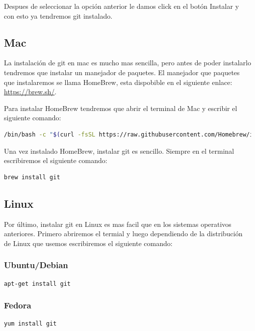 \documentclass[11pt, oneside]{article}
\begin{document}
Despues de seleccionar la opción anterior le damos click en el botón Instalar y con esto ya tendremos git instalado.

\subsection{Mac}
La instalación de git en mac es mucho mas sencilla, pero antes de poder instalarlo tendremos que instalar un manejador de paquetes. El manejador que paquetes que instalaremos se llama HomeBrew, esta dispobible en el siguiente enlace: \url{https://brew.sh/}.

Para instalar HomeBrew tendremos que abrir el terminal de Mac y escribir el siguiente comando:

\begin{lstlisting}[language=bash,caption={Comando para instalar HomeBrew}]
/bin/bash -c "$(curl -fsSL https://raw.githubusercontent.com/Homebrew/install/HEAD/install.sh)"
\end{lstlisting}

Una vez instalado HomeBrew, instalar git es sencillo. Siempre en el terminal escribiremos el siguiente comando:

\begin{lstlisting}[language=bash,caption={Comando para instalar git en Mac}]
brew install git
\end{lstlisting}

\subsection{Linux}
Por último, instalar git en Linux es mas facil que en los sistemas operativos anteriores. Primero abriremos el termial y luego dependiendo de la distribución de Linux que usemos escribiremos el siguiente comando:

\subsubsection{Ubuntu/Debian}
\begin{lstlisting}[language=bash,caption={Comando para instalar git en Ubuntu}]
apt-get install git
\end{lstlisting}

\subsubsection{Fedora}
\begin{lstlisting}[language=bash,caption={Comando para instalar git hasta Fedora21}]
yum install git
\end{lstlisting}
\end{document}
